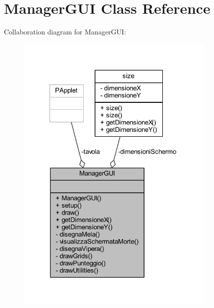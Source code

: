 \hypertarget{class_snake_1_1gui_1_1_manager_g_u_i}{}\section{Manager\+G\+UI Class Reference}
\label{class_snake_1_1gui_1_1_manager_g_u_i}


Collaboration diagram for Manager\+G\+UI\+:
\nopagebreak
\begin{figure}[H]
\begin{center}
\leavevmode
\includegraphics[width=274pt]{class_snake_1_1gui_1_1_manager_g_u_i__coll__graph}
\end{center}
\end{figure}
